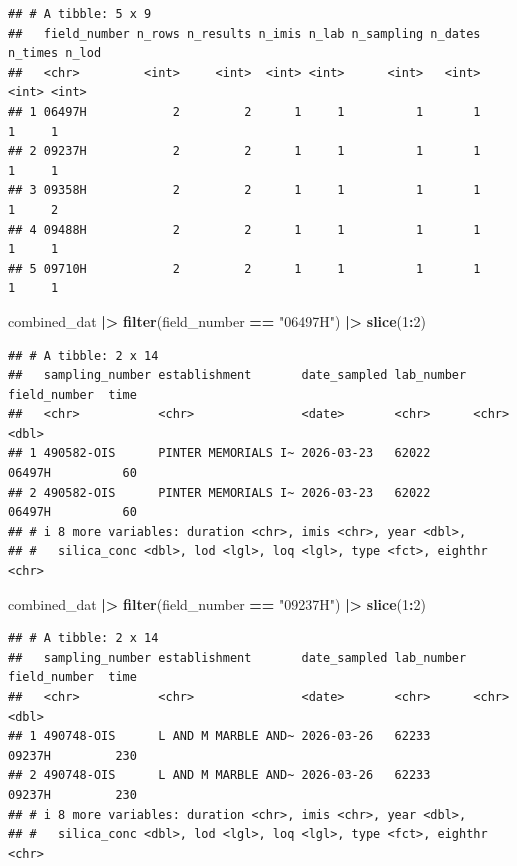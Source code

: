 \documentclass[
]{article}
\newenvironment{Shaded}{\begin{snugshade}}{\end{snugshade}}
\newcommand{\DecValTok}[1]{\textcolor[rgb]{0.00,0.00,0.81}{#1}}
\newcommand{\FunctionTok}[1]{\textcolor[rgb]{0.13,0.29,0.53}{\textbf{#1}}}
\newcommand{\NormalTok}[1]{#1}
\newcommand{\SpecialCharTok}[1]{\textcolor[rgb]{0.81,0.36,0.00}{\textbf{#1}}}
\newcommand{\StringTok}[1]{\textcolor[rgb]{0.31,0.60,0.02}{#1}}
\begin{document}
\begin{verbatim}
## # A tibble: 5 x 9
##   field_number n_rows n_results n_imis n_lab n_sampling n_dates n_times n_lod
##   <chr>         <int>     <int>  <int> <int>      <int>   <int>   <int> <int>
## 1 06497H            2         2      1     1          1       1       1     1
## 2 09237H            2         2      1     1          1       1       1     1
## 3 09358H            2         2      1     1          1       1       1     2
## 4 09488H            2         2      1     1          1       1       1     1
## 5 09710H            2         2      1     1          1       1       1     1
\end{verbatim}

\begin{Shaded}
\begin{Highlighting}[]
\NormalTok{combined\_dat }\SpecialCharTok{|\textgreater{}} 
  \FunctionTok{filter}\NormalTok{(field\_number }\SpecialCharTok{==} \StringTok{"06497H"}\NormalTok{) }\SpecialCharTok{|\textgreater{}} 
  \FunctionTok{slice}\NormalTok{(}\DecValTok{1}\SpecialCharTok{:}\DecValTok{2}\NormalTok{)}
\end{Highlighting}
\end{Shaded}

\begin{verbatim}
## # A tibble: 2 x 14
##   sampling_number establishment       date_sampled lab_number field_number  time
##   <chr>           <chr>               <date>       <chr>      <chr>        <dbl>
## 1 490582-OIS      PINTER MEMORIALS I~ 2026-03-23   62022      06497H          60
## 2 490582-OIS      PINTER MEMORIALS I~ 2026-03-23   62022      06497H          60
## # i 8 more variables: duration <chr>, imis <chr>, year <dbl>,
## #   silica_conc <dbl>, lod <lgl>, loq <lgl>, type <fct>, eighthr <chr>
\end{verbatim}

\begin{Shaded}
\begin{Highlighting}[]
\NormalTok{combined\_dat }\SpecialCharTok{|\textgreater{}} 
  \FunctionTok{filter}\NormalTok{(field\_number }\SpecialCharTok{==} \StringTok{"09237H"}\NormalTok{) }\SpecialCharTok{|\textgreater{}} 
  \FunctionTok{slice}\NormalTok{(}\DecValTok{1}\SpecialCharTok{:}\DecValTok{2}\NormalTok{)}
\end{Highlighting}
\end{Shaded}

\begin{verbatim}
## # A tibble: 2 x 14
##   sampling_number establishment       date_sampled lab_number field_number  time
##   <chr>           <chr>               <date>       <chr>      <chr>        <dbl>
## 1 490748-OIS      L AND M MARBLE AND~ 2026-03-26   62233      09237H         230
## 2 490748-OIS      L AND M MARBLE AND~ 2026-03-26   62233      09237H         230
## # i 8 more variables: duration <chr>, imis <chr>, year <dbl>,
## #   silica_conc <dbl>, lod <lgl>, loq <lgl>, type <fct>, eighthr <chr>
\end{verbatim}
\end{document}
